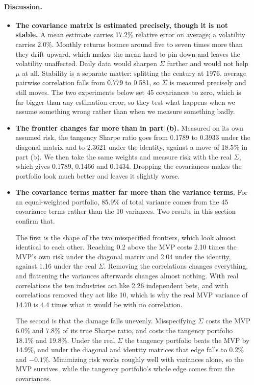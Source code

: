 \documentclass[11pt]{article}
\begin{document}
\paragraph{Discussion.}
\begin{itemize}
\setlength{\itemsep}{6pt}\setlength{\parskip}{0pt}

\item \textbf{The covariance matrix is estimated precisely, though it is not
stable.} A mean estimate carries 17.2\% relative error on average; a
volatility carries 2.0\%. Monthly returns bounce around five to seven times
more than they drift upward, which makes the mean hard to pin down and leaves
the volatility unaffected. Daily data would sharpen $\Sigma$ further and would
not help $\mu$ at all. Stability is a separate matter: splitting the century
at 1976, average pairwise correlation falls from 0.779 to 0.581, so $\Sigma$
is measured precisely and still moves. The two experiments below set 45
covariances to zero, which is far bigger than any estimation error, so they
test what happens when we assume something wrong rather than when we measure
something badly.

\item \textbf{The frontier changes far more than in part (b).} Measured on its
own assumed risk, the tangency Sharpe ratio goes from 0.1789 to 0.3933 under
the diagonal matrix and to 2.3621 under the identity, against a move of
18.5\% in part (b). We then take the same weights and measure risk with the
real $\Sigma$, which gives 0.1789, 0.1466 and 0.1434. Dropping the covariances
makes the portfolio look much better and leaves it slightly worse.

\item \textbf{The covariance terms matter far more than the variance terms.}
For an equal-weighted portfolio, 85.9\% of total variance comes from the 45
covariance terms rather than the 10 variances. Two results in this section
confirm that.

The first is the shape of the two misspecified frontiers, which look almost
identical to each other. Reaching 0.2 above the MVP costs 2.10 times the MVP's
own risk under the diagonal matrix and 2.04 under the identity, against 1.16
under the real $\Sigma$. Removing the correlations changes everything, and
flattening the variances afterwards changes almost nothing. With real
correlations the ten industries act like 2.26 independent bets, and with
correlations removed they act like 10, which is why the real MVP variance of
14.70 is 4.4 times what it would be with no correlation.

The second is that the damage falls unevenly. Misspecifying $\Sigma$ costs the
MVP 6.0\% and 7.8\% of its true Sharpe ratio, and costs the tangency portfolio
18.1\% and 19.8\%. Under the real $\Sigma$ the tangency portfolio beats the
MVP by 14.9\%, and under the diagonal and identity matrices that edge falls to
0.2\% and $-0.1\%$. Minimizing risk works roughly well with variances alone,
so the MVP survives, while the tangency portfolio's whole edge comes from the
covariances.

\end{itemize}
\end{document}

